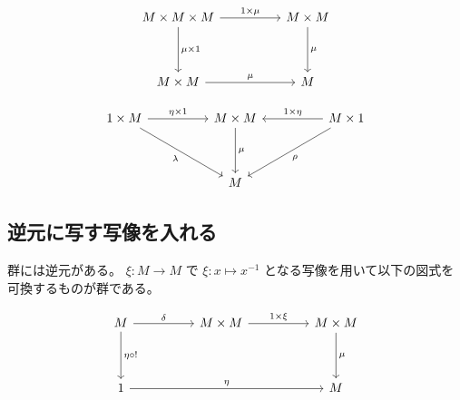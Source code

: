 \documentclass[uplatex,a4j,12pt,dvipdfmx]{jsarticle}
\begin{document}
\[
	\begin{tikzcd}
		M \times M \times M \arrow[rr, "1 \times \mu"] \arrow[dd, "\mu \times 1"] &  & M \times M \arrow[dd, "\mu"] \\
		&  &                              \\
		M \times M \arrow[rr, "\mu"]                                              &  & M
	\end{tikzcd}
\]

\[
	\begin{tikzcd}
		1 \times M \arrow[rr, "\eta \times 1"] \arrow[rrdd, "\lambda"'] &  & M \times M \arrow[dd, "\mu"] &  & M \times 1 \arrow[ll, "1 \times \eta"'] \arrow[lldd, "\rho"] \\
		&  &                              &  &                                                              \\
		&  & M                            &  &
	\end{tikzcd}
\]

\subsection{逆元に写す写像を入れる}


群には逆元がある。
$\xi : M \to M$ で $\xi : x \mapsto x^{-1}$ となる写像を用いて以下の図式を可換するものが群である。

\[
	\begin{tikzcd}
		M \arrow[dd, "\eta \circ !"] \arrow[rr, "\delta"] &  & M \times M \arrow[rr, "1 \times \xi"] &  & M \times M \arrow[dd, "\mu"] \\
		&  &                                       &  &                              \\
		1 \arrow[rrrr, "\eta"]            &  &                                       &  & M
	\end{tikzcd}
\]
\end{document}
